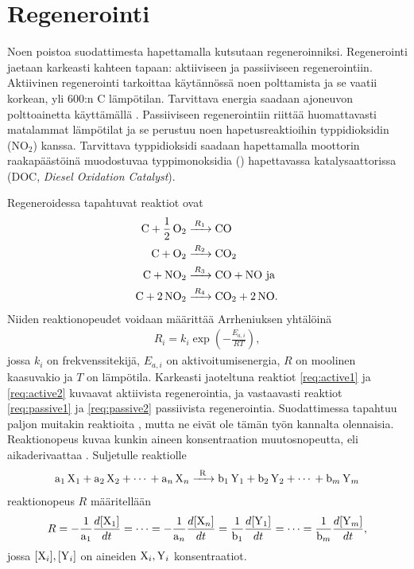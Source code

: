 \section{Regenerointi}
Noen poistoa suodattimesta hapettamalla kutsutaan regeneroinniksi. Regenerointi jaetaan karkeasti kahteen tapaan: aktiiviseen ja passiiviseen regenerointiin. 
Aktiivinen regenerointi tarkoittaa käytännössä noen polttamista ja se
vaatii korkean, yli 600:n \degree C lämpötilan. Tarvittava energia saadaan ajoneuvon polttoainetta käyttämällä \cite{dieselnet_dpf}. Passiiviseen regenerointiin riittää huomattavasti matalammat lämpötilat ja se perustuu noen hapetusreaktioihin typpidioksidin (NO\(_2\)) kanssa. Tarvittava typpidioksidi saadaan hapettamalla moottorin raakapäästöinä muodostuvaa typpimonoksidia () hapettavassa katalysaattorissa (DOC, \emph{Diesel Oxidation Catalyst}).

Regeneroidessa tapahtuvat reaktiot ovat  
\begin{align}
    \ce{C + 1/2 O2 &->[$R_1$] CO }\label{req:active1}\\
    \ce{C + O2 &->[$R_2$] CO2}\label{req:active2}\\
    \ce{C + NO2 &->[$R_3$] CO +  NO} \text{ ja }  \label{req:passive1} \\
    \ce{C + 2 NO2 &->[$R_4$] CO2 + 2 NO}. \label{req:passive2}
\end{align}
Niiden reaktionopeudet voidaan määrittää Arrheniuksen yhtälöinä \cite{LiuGuanlin2021Roio} \cite{Penghao_regen}
\begin{align}
    R_i =  k_i \exp\left({-\frac{E_{a,i}}{RT}}\right),
\end{align}
jossa \(k_i\) on frekvenssitekijä, \(E_{a, i}\) on aktivoitumisenergia, \(R\) on moolinen kaasuvakio ja \(T\) on lämpötila. Karkeasti jaoteltuna reaktiot \eqref{req:active1} ja \eqref{req:active2} kuvaavat aktiivista regenerointia, ja vastaavasti reaktiot \eqref{req:passive1} ja \eqref{req:passive2} passiivista regenerointia.
Suodattimessa tapahtuu paljon muitakin reaktioita \cite{Penghao_regen}, mutta ne eivät ole tämän työn kannalta olennaisia.
Reaktionopeus kuvaa kunkin aineen konsentraation muutosnopeutta, eli aikaderivaattaa \cite[s. 24-26]{chemical_reaction_kinetics}. Suljetulle reaktiolle
\begin{align}
    \ce{a1 X1 + a2 X2 + \cdots {} + a_n X_n ->[R] b1 Y1 + b2 Y2 + \cdots {} + b_m Y_m}
\end{align}
reaktionopeus \(R\) määritellään
\begin{align}
    R   = -\frac{1}{\ce{a1}}\frac{d[\ce{X1}]}{dt} 
        = \cdots 
        = -\frac{1}{\ce{a_n}}\frac{d[\ce{X_n}]}{dt}
        = \frac{1}{\ce{b1}}\frac{d[\ce{Y1}]}{dt} 
        = \cdots 
        = \frac{1}{\ce{b_m}}\frac{d[\ce{Y_m}]}{dt},
\end{align}
jossa \(\ce{[X_i], [Y_i]}\) on aineiden \(\ce{X_i, Y_i}\) konsentraatiot. 

